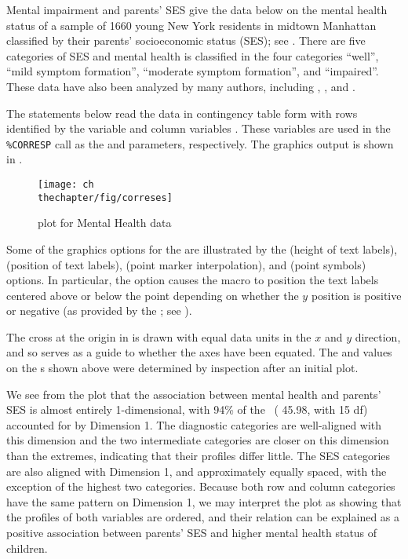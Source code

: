 \begin{Example}[mental1]{Mental impairment and parents' SES}
\citet[p. 289]{Srole-etal:78} give the data below on the mental
health status of a sample of 1660 young New York residents in midtown Manhattan
classified by their parents' socioeconomic status (SES);
see .
There are five categories of SES and mental health is classified
in the four categories ``well'', ``mild symptom formation'',
``moderate symptom formation'', and ``impaired''.
These data have also been analyzed by many authors, including
\citet[ \S 8.5.2]{Agresti:90},
\citet{Goodman:79}, and
\citet[p. 375]{Haberman:79}.

The statements below read the data in contingency table form with rows identified
by the variable  and column variables .
These variables are used in the \verb|%CORRESP| call as the 
and  parameters, respectively.
The graphics output is shown in .
\begin{figure}[htb]
  \centering
  \texttt{[image: ch\\thechapter/fig/correses]}
  \caption{ plot for Mental Health data}\label{fig:correses}
\end{figure}

Some of the graphics options for the 
are illustrated by the  (height of text labels),
 (position of text labels),  (point marker interpolation),
and  (point symbols) options.
In particular, the option  causes the macro to position the text labels
centered above or below the point depending on whether the $y$ position is positive
or negative
(as provided by the ; see ).

The cross at the origin in  is drawn with equal data units in the
$x$ and $y$ direction, and so serves as a guide to whether the axes
have been equated.  The  and  values on the s
shown above
were determined by inspection after an initial plot.

We see from the plot that the association between mental health
and parents' SES is almost entirely 1-dimensional, with 94\% of
the \chisq\ ( 45.98, with 15 df) accounted for by Dimension 1.
The diagnostic categories are well-aligned with this dimension and
the two intermediate categories are closer on this dimension than
the extremes, indicating that their profiles differ little.  The
SES categories are also aligned with Dimension 1, and approximately
equally spaced, with the exception of the highest two categories.
Because both row and column categories have the same pattern on
Dimension 1, we may interpret the plot as showing that the profiles
of both variables are ordered, and their relation can be explained
as a positive association between parents' SES and higher mental
health status of children.


\end{Example}
